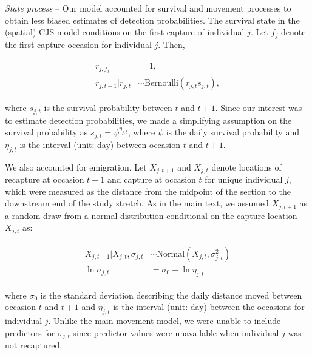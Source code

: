 \documentclass[11pt, class=article, crop=false]{standalone}
\begin{document}


\textit{State process} -- 
Our model accounted for survival and movement processes to obtain less biased estimates of detection probabilities.
The survival state in the (spatial) CJS model conditions on the first capture of individual $j$.
Let $f_{j}$ denote the first capture occasion for individual $j$.
Then,

\begin{align}
    \begin{split}
        r_{j, f_j} &= 1,\\
    r_{j, t + 1} | r_{j, t} &\sim \text{Bernoulli}(r_{j,t} s_{j,t}),    
    \end{split}
\end{align}

where $s_{j,t}$ is the survival probability between $t$ and $t + 1$.
Since our interest was to estimate detection probabilities, we made a simplifying assumption on the survival probability as $s_{j, t} = \psi^{\eta_{j,t}}$, where $\psi$ is the daily survival probability and $\eta_{j,t}$ is the interval (unit: day) between occasion $t$ and $t + 1$.

We also accounted for emigration.
Let $X_{j, t+1}$ and $X_{j, t}$ denote locations of recapture at occasion $t+1$ and capture at occasion $t$ for unique individual $j$, which were measured as the distance from the midpoint of the section to the downstream end of the study stretch.
As in the main text, we assumed $X_{j,t+1}$ as a random draw from a normal distribution conditional on the capture location $X_{j,t}$ as:

\begin{align}
    \begin{split}
        X_{j, t+1}|X_{j, t}, \sigma_{j, t} &\sim \text{Normal}(X_{j, t}, \sigma_{j, t}^2)\\
        \ln \sigma_{j, t} &= \sigma_0 + \ln \eta_{j, t}
    \end{split}
    \label{eq:si-normal}
\end{align}

where $\sigma_0$ is the standard deviation describing the daily distance moved between occasion $t$ and $t+1$ and $\eta_{j,t}$ is the interval (unit: day) between the occasions for individual $j$.
Unlike the main movement model, we were unable to include predictors for $\sigma_{j,t}$ since predictor values were unavailable when individual $j$ was not recaptured.
\end{document}
